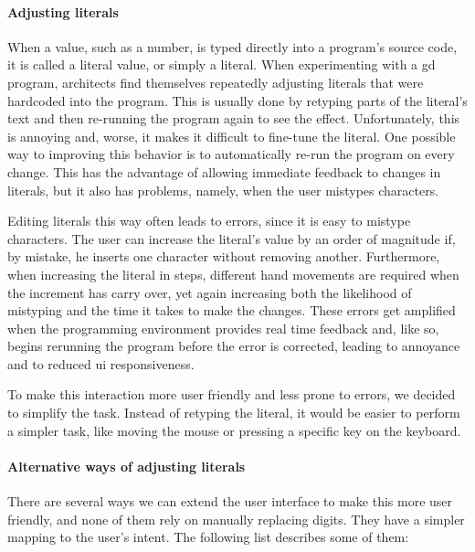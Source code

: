 \paragraph{Adjusting literals}
When a value, such as a number, is typed directly into a program's source code, it is called a literal value, or simply a literal.
When experimenting with a \gls{gd} program, architects find themselves repeatedly adjusting literals that were hardcoded into the program.
This is usually done by retyping parts of the literal's text and then re-running the program again to see the effect.
Unfortunately, this is annoying and, worse, it makes it difficult to fine-tune the literal.
One possible way to improving this behavior is to automatically re-run the program on every change.
This has the advantage of allowing immediate feedback to changes in literals, but it also has problems, namely, when the user mistypes characters.

Editing literals this way often leads to errors, since it is easy to mistype characters.
The user can increase the literal's value by an order of magnitude if, by mistake, he inserts one character without removing another.
Furthermore, when increasing the literal in steps, different hand movements are required when the increment has carry over, yet again increasing both the likelihood of mistyping and the time it takes to make the changes.
These errors get amplified when the programming environment provides real time feedback and, like so, begins rerunning the program before the error is corrected, leading to annoyance and to reduced \gls{ui} responsiveness.

To make this interaction more user friendly and less prone to errors, we decided to simplify the task.
Instead of retyping the literal, it would be easier to perform a simpler task, like moving the mouse or pressing a specific key on the keyboard.

\paragraph{Alternative ways of adjusting literals}
There are several ways we can extend the user interface to make this more user friendly, and none of them rely on manually replacing digits.
They have a simpler mapping to the user's intent.
The following list describes some of them:

